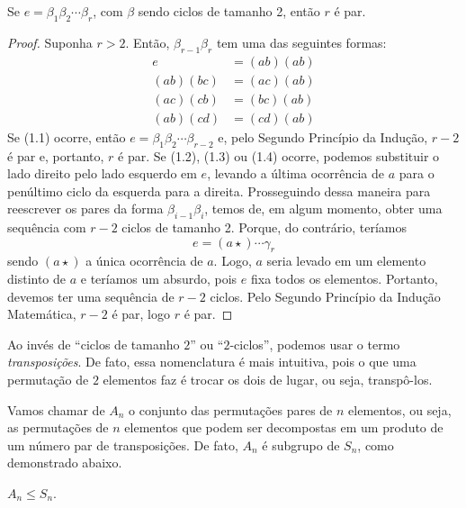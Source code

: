     \begin{lemma}
		\label{lema identidade permutacoes}
		\hspace{12pt} Se $e = \beta_{1}\beta_{2}\cdots\beta_{r}$, com $\beta$ sendo ciclos de tamanho 2, então $r$ é par.
	\end{lemma}
	\begin{proof}
		\vspace{0.3cm}\par Suponha $r>2$. Então, $\beta_{r-1}\beta_{r}$ tem uma das seguintes formas:
		\begin{align}
		e &= (ab)(ab) \\
		(ab)(bc) &= (ac)(ab) \\
		(ac)(cb) &= (bc)(ab) \\
		(ab)(cd) &= (cd)(ab) 
		\end{align}
		Se (1.1) ocorre, então $e = \beta_{1}\beta_{2}\cdots\beta_{r-2}$ e, pelo Segundo Princípio da Indução, $r-2$ é par e, portanto, $r$ é par. Se (1.2), (1.3) ou (1.4) ocorre, podemos substituir o lado direito pelo lado esquerdo em $e$, levando a última ocorrência de $a$ para o penúltimo ciclo da esquerda para a direita. Prosseguindo dessa maneira para reescrever os pares da forma $\beta_{i-1}\beta_{i}$, temos de, em algum momento, obter uma sequência com $r-2$ ciclos de tamanho 2. Porque, do contrário, teríamos
		\begin{equation*}
		e = (a \star)\cdots\gamma_{r}
		\end{equation*}   
		sendo $(a\star)$ a única ocorrência de $a$. Logo, $a$ seria levado em um elemento distinto de $a$ e teríamos um absurdo, pois $e$ fixa todos os  elementos. Portanto, devemos ter uma sequência de $r-2$ ciclos. Pelo Segundo Princípio da Indução Matemática, $r-2$ é par, logo $r$ é par.
	\end{proof}
	\par\vspace{0.3cm} Ao invés de ``ciclos de tamanho $2$'' ou ``$2$-ciclos'', podemos usar o termo \textit{transposições}. De fato, essa nomenclatura é mais intuitiva, pois o que uma permutação de $2$ elementos faz é trocar os dois de lugar, ou seja, transpô-los.
	\par\vspace{0.3cm} Vamos chamar de $A_n$ o conjunto das permutações pares de $n$ elementos, ou seja, as permutações de $n$ elementos que podem ser decompostas em um produto de um número par de transposições. De fato, $A_n$ é subgrupo de $S_n$, como demonstrado abaixo.
	\begin{theorem}
		\label{grupo alternante subgrupo de S_n}
		$A_n \leq S_n$.
	\end{theorem}
